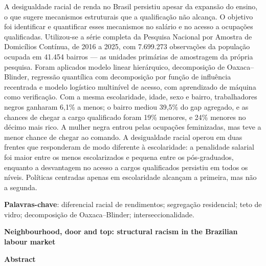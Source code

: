 \documentclass[11pt, a4paper, oneside]{article}
\begin{document}
\begin{singlespace}\noindent
A desigualdade racial de renda no Brasil persistiu apesar da expansão do ensino,
o que sugere mecanismos estruturais que a qualificação não alcança. O objetivo foi
identificar e quantificar esses mecanismos no salário e no acesso a ocupações
qualificadas. Utilizou-se a série completa da Pesquisa Nacional por Amostra de
Domicílios Contínua, de 2016 a 2025, com 7.699.273 observações da
população ocupada em 41.454 bairros --- as unidades primárias de
amostragem da própria pesquisa. Foram aplicados modelo linear hierárquico,
decomposição de Oaxaca--Blinder, regressão quantílica com decomposição por função de
influência recentrada e modelo logístico multinível de acesso, com aprendizado de
máquina como verificação. Com a mesma escolaridade, idade, sexo e bairro,
trabalhadores negros ganharam 6,1\% a menos; o bairro mediou
39,5\% do gap agregado, e as chances de chegar a cargo qualificado
foram 19\% menores, e 24\% menores no décimo mais rico. A mulher negra entrou pelas ocupações feminizadas, mas teve a menor chance de chegar ao comando.
A desigualdade racial operou em duas frentes que responderam de modo diferente à escolaridade: a penalidade salarial foi maior entre os menos escolarizados e pequena entre os pós-graduados, enquanto a desvantagem no acesso a cargos qualificados persistiu em todos os níveis. Políticas centradas apenas em escolaridade alcançam a primeira, mas não a segunda.
\end{singlespace}

\vspace{\baselineskip}
\noindent\textbf{Palavras-chave}: diferencial racial de rendimentos;
segregação residencial; teto de vidro; decomposição de Oaxaca--Blinder;
interseccionalidade.

\newpage

\begin{center}
{\fontsize{11}{14}\selectfont\bfseries
Neighbourhood, door and top: structural racism in the Brazilian
labour market\par}
\end{center}

\vspace{\baselineskip}
\noindent\textbf{Abstract}
\vspace{\baselineskip}
\end{document}
